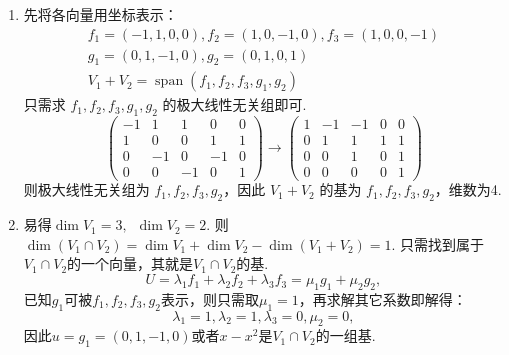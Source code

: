 \documentclass[UTF8,12pt,a4paper,fontset=fandol]{ctexart}
\begin{document}
\begin{solve}
\begin{enumerate}
                \item 先将各向量用坐标表示：
                      \begin{gather*}
                          f_1=(-1,1,0,0),f_2=(1,0,-1,0),f_3=(1,0,0,-1) \\
                          g_1=(0,1,-1,0),g_2=(0,1,0,1) \\
                          V_1+V_2=\operatorname{span}(f_1,f_2,f_3,g_1,g_2)
                      \end{gather*}
                      只需求 $f_1,f_2,f_3,g_1,g_2$ 的极大线性无关组即可.
                      \[\begin{pmatrix}
                              -1 & 1  & 1  & 0  & 0 \\
                              1  & 0  & 0  & 1  & 1 \\
                              0  & -1 & 0  & -1 & 0 \\
                              0  & 0  & -1 & 0  & 1
                          \end{pmatrix}\rightarrow
                          \begin{pmatrix}1 & -1 & -1 & 0 & 0 \\
                 0 & 1  & 1  & 1 & 1 \\
                 0 & 0  & 1  & 0 & 1 \\
                 0 & 0  & 0  & 0 & 1
                          \end{pmatrix}\]
                      则极大线性无关组为 $f_1,f_2,f_3,g_2$，因此 $V_1+V_2$ 的基为 $f_1,f_2,f_3,g_2$，维数为4.

                \item 易得$\dim V_1=3,\enspace \dim V_2=2$. 则$\dim (V_1\cap V_2)= \dim V_1+\dim V_2-\dim (V_1+V_2)=1$. 只需找到属于$V_1\cap V_2$的一个向量，其就是$V_1\cap V_2$的基.
                      \[U=\lambda_1f_1+\lambda_2f_2+\lambda_3f_3= \mu_1g_1+\mu_2g_2,\]
                      已知$g_1$可被$f_1,f_2,f_3,g_2$表示，则只需取$\mu_1=1$，再求解其它系数即解得：
                      \[\lambda_1=1,\lambda_2=1,\lambda_3=0,\mu_2=0,\]
                      因此$u=g_1=(0,1,-1,0)$或者$x-x^2$是$V_1\cap V_2$的一组基.


\end{enumerate}
\end{solve}
\end{document}
